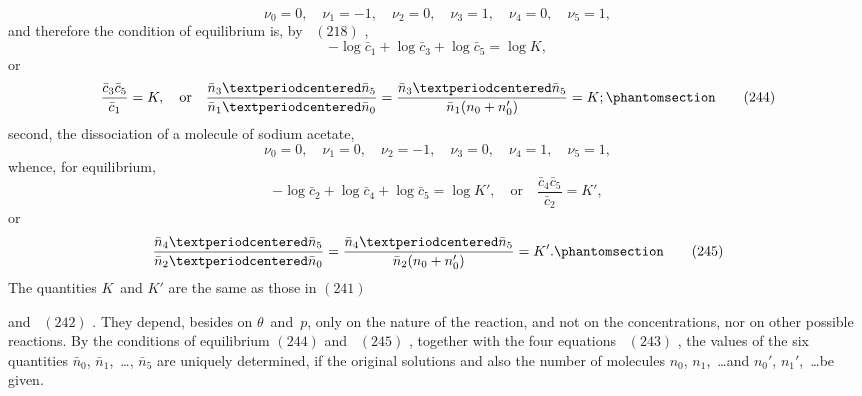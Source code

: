 \documentclass[12pt]{book}[2005/09/16]
\newcommand{\Chg}[2]{#2}
\newcommand{\Add}[1]{\Chg{}{#1}}
\newcommand{\Tag}[1]{%
  \phantomsection\label{eqn:#1}\tag*{\ensuremath{#1}}%
}
\newcommand{\Eq}[1]{%
  \hyperref[eqn:#1]{\ensuremath{#1}}%
}
\newcommand{\PageSep}[1]{\ignorespaces}
\begin{document}
\[
\nu_{0} = 0,\quad
\nu_{1} = -1,\quad
\nu_{2} = 0,\quad
\nu_{3} = 1,\quad
\nu_{4} = 0,\quad
\nu_{5} = 1,
\]
and therefore the condition of equilibrium is, by~\Eq{(218)},
\[
-\log \bar{c}_{1} + \log \bar{c}_{3} + \log \bar{c}_{5} = \log K,
\]
or
\[
\frac{\bar{c}_{3} \bar{c}_{5}}{\bar{c}_{1}} = K,\quad\text{or}\quad
\frac{\bar{n}_{3} · \bar{n}_{5}}{\bar{n}_{1} · \bar{n}_{0}}
  = \frac{\bar{n}_{3} · \bar{n}_{5}}{\bar{n}_{1} (n_{0} + n_{0}')} = K;
\Tag{(244)}
\]
second, the dissociation of a molecule of sodium acetate,
\[
\nu_{0} = 0,\quad
\nu_{1} = 0,\quad
\nu_{2} = -1,\quad
\nu_{3} = 0,\quad
\nu_{4} = 1,\quad
\nu_{5} = 1,
\]
whence, for equilibrium,
\[
-\log \bar{c}_{2} + \log \bar{c}_{4} + \log \bar{c}_{5} = \log K',
\quad\text{or}\quad
\frac{\bar{c}_{4} \bar{c}_{5}}{\bar{c}_{2}} = K',
\]
or
\[
\frac{\bar{n}_{4} · \bar{n}_{5}}{\bar{n}_{2} · \bar{n}_{0}}
  = \frac{\bar{n}_{4} · \bar{n}_{5}}{\bar{n}_{2} (n_{0} + n_{0}')} = K'.
\Tag{(245)}
\]
The quantities $K$~and $K'$ are the same as those in \Eq{(241)}
and~\Eq{(242)}. They depend, besides on $\theta$~and~$p$, only on the
nature of the reaction, and not on the concentrations, nor
on other possible reactions. By the conditions of equilibrium
\Eq{(244)} and~\Eq{(245)}, together with the four equations~\Eq{(243)}, the
values of the six quantities $\bar{n}_{0}$, $\bar{n}_{1}$,~\dots\Add{,} $\bar{n}_{5}$ are uniquely
\PageSep{258}
determined, if the original solutions and also the number of
molecules $n_{0}$, $n_{1}$,~\dots and $n_{0}'$, $n_{1}'$\Add{,}~\dots be given.
\end{document}

